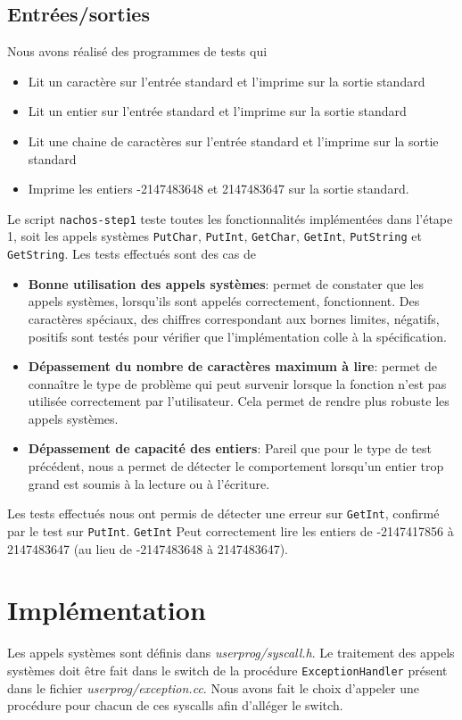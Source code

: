 \documentclass{report}
\begin{document}
\subsection*{Entrées/sorties}
Nous avons réalisé des programmes de tests qui
\begin{itemize}
 \item Lit un caractère sur l'entrée standard et l'imprime sur la sortie standard
 \item Lit un entier sur l'entrée standard et l'imprime sur la sortie standard
 \item Lit une chaine de caractères sur l'entrée standard et l'imprime sur la sortie
 standard
 \item Imprime les entiers -2147483648 et 2147483647 sur la sortie standard.
\end{itemize}
Le script \texttt{nachos-step1} teste toutes les fonctionnalités implémentées dans l'étape 1, soit les appels systèmes \texttt{PutChar}, \texttt{PutInt}, \texttt{GetChar}, \texttt{GetInt}, \texttt{PutString} et \texttt{GetString}.
Les tests effectués sont des cas de
\begin{itemize}
 \item \textbf{Bonne utilisation des appels systèmes}: permet de constater que les appels systèmes, lorsqu'ils sont appelés correctement, fonctionnent. Des caractères spéciaux, des chiffres correspondant aux bornes limites, négatifs, positifs sont testés pour vérifier que l'implémentation colle à la spécification.
 \item \textbf{Dépassement du nombre de caractères maximum à lire}: permet de connaître le type de problème qui peut survenir lorsque la fonction n'est pas utilisée correctement par l'utilisateur. Cela permet de rendre plus robuste les appels systèmes.
 \item \textbf{Dépassement de capacité des entiers}: Pareil que pour le type de test précédent, nous a permet de détecter le comportement lorsqu'un entier trop grand est soumis à la lecture ou à l'écriture.
\end{itemize}
Les tests effectués nous ont permis de détecter une erreur sur \texttt{GetInt}, confirmé par le test sur \texttt{PutInt}. \texttt{GetInt} Peut correctement lire les entiers de -2147417856 à 2147483647 (au lieu de -2147483648 à 2147483647).

\section*{Implémentation}
Les appels systèmes sont définis dans \textit{userprog/syscall.h}. Le traitement des appels systèmes doit être fait dans le switch de la procédure \texttt{ExceptionHandler} présent dans le fichier \textit{userprog/exception.cc}. Nous avons fait le choix d'appeler une procédure pour chacun de ces syscalls afin d'alléger le switch.
\end{document}
